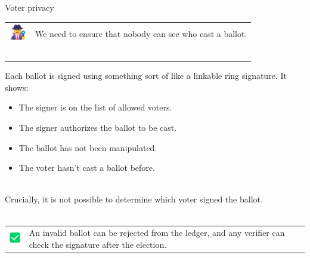 \documentclass[aspectratio=169]{beamer}
\begin{document}
\begin{frame}{Voter privacy}
    \begin{tabular}{>{\arraybackslash}m{40px} >{\arraybackslash}m{320px}}
        \includegraphics[width=30px]{images/detective.png} & We need to ensure that nobody can see who cast a ballot. \\~\\
    \end{tabular}

    Each ballot is signed using something sort of like a linkable ring signature.
    It shows:
    \begin{itemize}
        \item The signer is on the list of allowed voters.
        \item The signer authorizes the ballot to be cast.
        \item The ballot has not been manipulated.
        \item The voter hasn't cast a ballot before. \\~\\
    \end{itemize}

    Crucially, it is not possible to determine which voter signed the ballot. \\~\\

    \begin{tabular}{>{\arraybackslash}m{40px} >{\arraybackslash}m{320px}}
        \includegraphics[width=30px]{images/check.png} & An invalid ballot can be rejected from the ledger, and any verifier can check the signature after the election. \\
    \end{tabular}
\end{frame}
\end{document}
